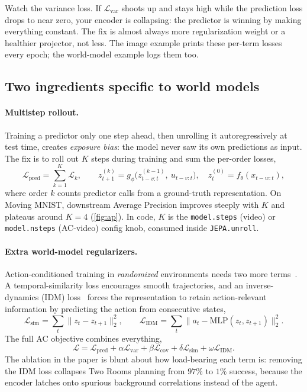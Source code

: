 \documentclass{article}
\newcommand{\code}[1]{\texttt{\small #1}}
\begin{document}
\begin{gotchabox}
Watch the variance loss. If $\mathcal{L}_{\text{var}}$ shoots up and stays high
while the prediction loss drops to near zero, your encoder is collapsing: the
predictor is winning by making everything constant. The fix is almost always more
regularization weight or a healthier projector, not less. The image example
prints these per-term losses every epoch; the world-model example logs them too.
\end{gotchabox}

\subsection{Two ingredients specific to world models}

\paragraph{Multistep rollout.} Training a predictor only one step ahead, then
unrolling it autoregressively at test time, creates \emph{exposure bias}: the
model never saw its own predictions as input. The fix is to roll out $K$ steps
during training and sum the per-order losses,
\begin{equation}
\mathcal{L}_{\text{pred}} = \sum_{k=1}^{K} \mathcal{L}_k,
\qquad z^{(k)}_{t+1} = g_\phi\big(z^{(k-1)}_{t-v:t},\ u_{t-v:t}\big),\quad z^{(0)}_t = f_\theta(x_{t-w:t}),
\label{eq:rollout}
\end{equation}
where order $k$ counts predictor calls from a ground-truth representation. On
Moving MNIST, downstream Average Precision improves steeply with $K$ and plateaus
around $K{=}4$ (\cref{fig:ap}). In code, $K$ is the \code{model.steps} (video) or
\code{model.nsteps} (AC-video) config knob, consumed inside \code{JEPA.unroll}.

\paragraph{Extra world-model regularizers.} Action-conditioned training in
\emph{randomized} environments needs two more terms~\citep{sobal2022jepaslowfeatures}.
A temporal-similarity loss encourages smooth trajectories, and an inverse-dynamics
(IDM) loss~\citep{PathAMI,curiositydrivenexplorationselfsupervisedprediction}
forces the representation to retain action-relevant information by predicting the
action from consecutive states,
\begin{equation}
\mathcal{L}_{\text{sim}} = \sum_t \|z_t - z_{t+1}\|_2^2,
\qquad
\mathcal{L}_{\text{IDM}} = \sum_t \|a_t - \mathrm{MLP}(z_t, z_{t+1})\|_2^2.
\label{eq:idm}
\end{equation}
The full AC objective combines everything,
\begin{equation}
\mathcal{L} = \mathcal{L}_{\text{pred}} + \alpha\mathcal{L}_{\text{var}} + \beta\mathcal{L}_{\text{cov}} + \delta\mathcal{L}_{\text{sim}} + \omega\mathcal{L}_{\text{IDM}}.
\label{eq:full}
\end{equation}
The ablation in the paper is blunt about how load-bearing each term is: removing
the IDM loss collapses Two Rooms planning from $97\%$ to $1\%$ success, because
the encoder latches onto spurious background correlations instead of the agent.
\end{document}
